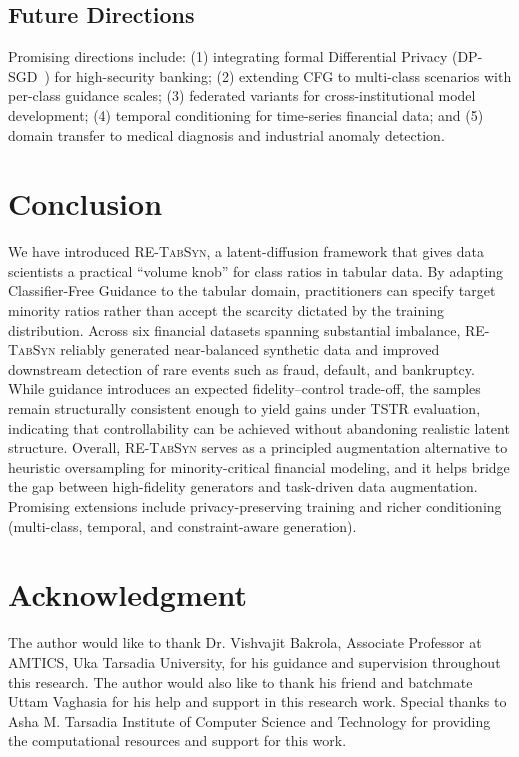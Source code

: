 \documentclass[conference]{IEEEtran}
\newcommand{\retabsyn}{\textsc{RE-TabSyn}}
\begin{document}
\subsection{Future Directions}
Promising directions include: (1) integrating formal Differential Privacy (DP-SGD~\cite{abadi2016dpsgd}) for high-security banking; (2) extending CFG to multi-class scenarios with per-class guidance scales; (3) federated variants for cross-institutional model development; (4) temporal conditioning for time-series financial data; and (5) domain transfer to medical diagnosis and industrial anomaly detection.

\section{Conclusion}

We have introduced \retabsyn{}, a latent-diffusion framework that gives data scientists a practical ``volume knob'' for class ratios in tabular data. By adapting Classifier-Free Guidance to the tabular domain, practitioners can specify target minority ratios rather than accept the scarcity dictated by the training distribution. Across six financial datasets spanning substantial imbalance, \retabsyn{} reliably generated near-balanced synthetic data and improved downstream detection of rare events such as fraud, default, and bankruptcy. While guidance introduces an expected fidelity--control trade-off, the samples remain structurally consistent enough to yield gains under TSTR evaluation, indicating that controllability can be achieved without abandoning realistic latent structure. Overall, \retabsyn{} serves as a principled augmentation alternative to heuristic oversampling for minority-critical financial modeling, and it helps bridge the gap between high-fidelity generators and task-driven data augmentation. Promising extensions include privacy-preserving training and richer conditioning (multi-class, temporal, and constraint-aware generation).

\section*{Acknowledgment}

The author would like to thank Dr. Vishvajit Bakrola, Associate Professor at AMTICS, Uka Tarsadia University, for his guidance and supervision throughout this research. The author would also like to thank his friend and batchmate Uttam Vaghasia for his help and support in this research work. Special thanks to Asha M. Tarsadia Institute of Computer Science and Technology for providing the computational resources and support for this work.




\end{document}
